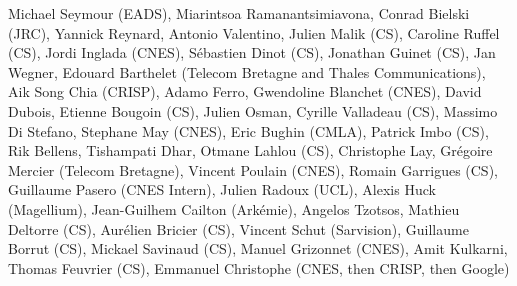 Michael Seymour (EADS), Miarintsoa Ramanantsimiavona, Conrad Bielski (JRC), Yannick Reynard, Antonio Valentino, Julien Malik (CS), Caroline Ruffel (CS), Jordi Inglada (CNES), S\'ebastien Dinot (CS), Jonathan Guinet (CS), Jan Wegner, Edouard Barthelet (Telecom Bretagne and Thales Communications), Aik Song Chia (CRISP), Adamo Ferro, Gwendoline Blanchet (CNES), David Dubois, Etienne Bougoin (CS), Julien Osman, Cyrille Valladeau (CS), Massimo Di Stefano, Stephane May (CNES), Eric Bughin (CMLA), Patrick Imbo (CS), Rik Bellens, Tishampati Dhar, Otmane Lahlou (CS), Christophe Lay, Gr\'egoire Mercier (Telecom Bretagne), Vincent Poulain (CNES), Romain Garrigues (CS), Guillaume Pasero (CNES Intern), Julien Radoux (UCL), Alexis Huck (Magellium), Jean-Guilhem Cailton (Ark\'emie), Angelos Tzotsos, Mathieu Deltorre (CS), Aur\'elien Bricier (CS), Vincent Schut (Sarvision), Guillaume Borrut (CS), Mickael Savinaud (CS), Manuel Grizonnet (CNES), Amit Kulkarni, Thomas Feuvrier (CS), Emmanuel Christophe (CNES, then CRISP, then Google)